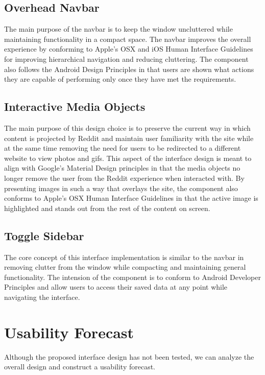 \documentclass{article}
\begin{document}
\subsection{Overhead Navbar} The main purpose of the navbar is to keep the window uncluttered while maintaining functionality in a compact space. The navbar improves the overall experience by conforming to Apple's OSX and iOS Human Interface Guidelines for improving hierarchical navigation and reducing cluttering. The component also follows the Android Design Principles in that users are shown what actions they are capable of performing only once they have met the requirements.

\subsection{Interactive Media Objects} The main purpose of this design choice is to preserve the current way in which content is projected by Reddit and maintain user familiarity with the site while at the same time removing the need for users to be redirected to a different website to view photos and gifs. This aspect of the interface design is meant to align with Google's Material Design principles in that the media objects no longer remove the user from the Reddit experience when interacted with. By presenting images in such a way that overlays the site, the component also conforms to Apple's OSX Human Interface Guidelines in that the active image is highlighted and stands out from the rest of the content on screen.

\subsection{Toggle Sidebar} The core concept of this interface implementation is similar to the navbar in removing clutter from the window while compacting and maintaining general functionality. The intension of the component is to conform to Android Developer Principles and allow users to access their saved data at any point while navigating the interface.

\section{Usability Forecast} Although the proposed interface design has not been tested, we can analyze the overall design and construct a usability forecast.
\end{document}
